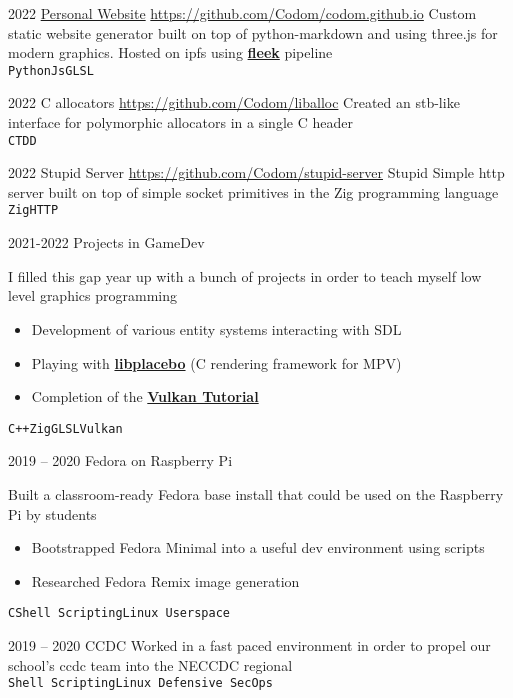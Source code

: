 \documentclass[9pt]{developercv} %
\begin{document}

\begin{entrylist}
	\entry
	{2022}
	{\href{https://chrisodom.org/}{Personal Website}}
        {\href{https://github.com/Codom/codom.github.io}{https://github.com/Codom/codom.github.io}}
        {Custom static website generator built on top of python-markdown and using three.js for modern
	graphics. Hosted on ipfs using \href{https://fleek.co}{\bf fleek} pipeline
	\\
	\texttt{Python}\slashsep\texttt{Js}\slashsep\texttt{GLSL}}

	\entry
	{2022}
        {C allocators}
        {\href{https://github.com/Codom/liballoc}{https://github.com/Codom/liballoc}}
        {Created an stb-like interface for polymorphic allocators in a single C header\\
        \texttt{C}\slashsep\texttt{TDD}}

	\entry
        {2022}
        {Stupid Server}
        {\href{https://github.com/Codom/stupid-server}{https://github.com/Codom/stupid-server}}
        {Stupid Simple http server built on top of simple socket primitives
        in the Zig programming language\\
        \texttt{Zig}\slashsep\texttt{HTTP}}
\end{entrylist}


\begin{entrylist}
	\entry
		{2021-2022}
		{Projects in GameDev}
        {}
        {I filled this gap year up with a bunch of projects in order to teach myself low level graphics programming
        \begin{itemize}\itemsep=0em
            \item Development of various entity systems interacting with SDL
	    \item Playing with {\bf \href{https://github.com/haasn/libplacebo}{libplacebo}}
		    (C rendering framework for MPV)
	    \item Completion of the {\bf \href{https://github.com/Codom/Vulkan-Tutorial}{Vulkan Tutorial}}
        \end{itemize}
        \texttt{C++}\slashsep\texttt{Zig}\slashsep\texttt{GLSL}\slashsep\texttt{Vulkan}}
	\entry
		{2019 -- 2020}
		{Fedora on Raspberry Pi}
        {}
        {
	Built a classroom-ready Fedora base install that could be used on the Raspberry Pi by students
	\begin{itemize}\itemsep=0em
		\item Bootstrapped Fedora Minimal into a useful dev environment using scripts
		\item Researched Fedora Remix image generation
	\end{itemize}
	\texttt{C}\slashsep\texttt{Shell Scripting}\slashsep\texttt{Linux Userspace}}
	\entry
		{2019 -- 2020}
		{CCDC}
        {}
        {Worked in a fast paced environment in order to propel our school's ccdc team into
	the NECCDC regional\\
        \texttt{Shell Scripting}\slashsep\texttt{Linux Defensive SecOps}}
\end{entrylist}


\end{document}
